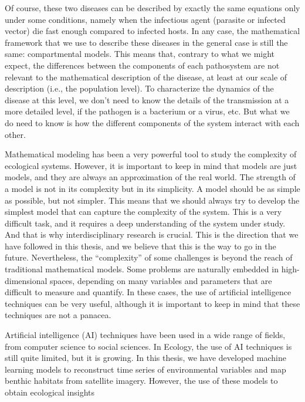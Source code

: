 Of course, these two diseases can be described by exactly the same equations
only under some conditions, namely when the infectious agent (parasite or
infected vector) die fast enough compared to infected hosts. In any case, the
mathematical framework that we use to describe these diseases in the general
case is still the same: compartmental models. This means that, contrary to what
we might expect, the differences between the components of each pathosystem are
not relevant to the mathematical description of the disease, at least at our
scale of description (i.e., the population level). To characterize the dynamics
of the disease at this level, we don't need to know the details of the
transmission at a more detailed level, if the pathogen is a bacterium or a
virus, etc. But what we do need to know is how the different components of the
system interact with each other.

Mathematical modeling has been a very powerful tool to study the complexity of
ecological systems. However, it is important to keep in mind that models are
just models, and they are always an approximation of the real world. The
strength of a model is not in its complexity but in its simplicity. A model
should be as simple as possible, but not simpler. This means that we should
always try to develop the simplest model that can capture the complexity of the
system. This is a very difficult task, and it requires a deep understanding of
the system under study. And that is why interdisciplinary research is
crucial. This is the direction that we have followed in this thesis, and we
believe that this is the way to go in the future. Nevertheless, the
``complexity'' of some challenges is beyond the reach of traditional
mathematical models. Some problems are naturally embedded in high-dimensional
spaces, depending on many variables and parameters that are
difficult to measure and quantify. In these cases, the use of artificial
intelligence techniques can be very useful, although it is important to keep in
mind that these techniques are not a panacea.


Artificial intelligence (AI) techniques have been used in a wide range of
fields, from computer science to social sciences. In Ecology, the use of
AI techniques is still quite limited, but it is growing. In this thesis, we
have
developed machine learning models to reconstruct time series of environmental
variables and map benthic habitats from satellite imagery. However, the use of
these models to obtain ecological insights

